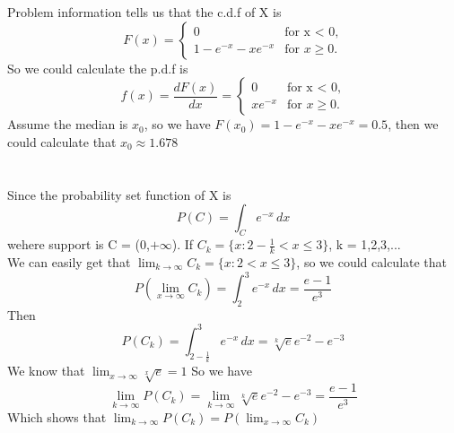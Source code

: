 \documentclass[10.5pt]{article}
\begin{document}
\section{}
Problem information tells us that the c.d.f of X is$$F(x) = 
\begin{cases}
    0&\mbox{for x < 0,}\\
    1 - e^{-x} -xe^{-x}&\mbox{for $x\geqslant 0$.}
\end{cases}$$\indent
So we could calculate the p.d.f is$$f(x) = \frac{d F(x)}{d x} = 
\begin{cases}
    0&\mbox{for x < 0,}\\
    xe^{-x}&\mbox{for $x\geqslant 0$.}
\end{cases}$$\indent
Assume the median is $x_0$, so we have $F(x_0) = 1 - e^{-x} - xe^{-x} = 0.5$, then we could calculate that $x_0 \approx 1.678$

\section{}
Since the probability set function of X is $$P(C) = \int_{C} e^{-x} \,dx$$\indent wehere support is C = (0,$+\infty$). If $C_k = \{x : 2 - \frac{1}{k}< x\leqslant3\}$, k = 1,2,3,...\\\indent
We can easily get that $\lim_{k \to \infty} C_k = \{x : 2 < x \leqslant 3\}$, so we could calculate that$$P(\lim_{x \to \infty} C_k) = \int_2^3 e^{-x} \,dx = \frac{e-1}{e^{3}}$$\indent
Then $$P(C_k) = \int_{2-\frac{1}{k}}^3 e^{-x} \,dx = \sqrt[k]{e}e^{-2} - e^{-3}$$\indent
We know that $\lim_{x\to \infty} \sqrt[x]{e} = 1$ So we have $$\lim_{k\to \infty}P(C_k) = \lim_{k\to \infty} \sqrt[k]{e}e^{-2} - e^{-3} = \frac{e-1}{e^3}$$\indent
Which shows that $\lim_{k\to \infty}P(C_k) = P(\lim_{x \to \infty} C_k)$
\end{document}
